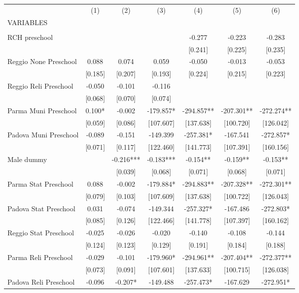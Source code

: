 \begin{tabular}{lcccccc} \hline
 & (1) & (2) & (3) & (4) & (5) & (6) \\
VARIABLES &  &  &  &  &  &  \\ \hline
 &  &  &  &  &  &  \\
RCH preschool &  &  &  & -0.277 & -0.223 & -0.283 \\
 &  &  &  & [0.241] & [0.225] & [0.235] \\
Reggio None Preschool & 0.088 & 0.074 & 0.059 & -0.050 & -0.013 & -0.053 \\
 & [0.185] & [0.207] & [0.193] & [0.224] & [0.215] & [0.223] \\
Reggio Reli Preschool & -0.050 & -0.101 & -0.116 &  &  &  \\
 & [0.068] & [0.070] & [0.074] &  &  &  \\
Parma Muni Preschool & 0.100* & -0.002 & -179.857* & -294.857** & -207.301** & -272.274** \\
 & [0.059] & [0.086] & [107.607] & [137.638] & [100.720] & [126.042] \\
Padova Muni Preschool & -0.089 & -0.151 & -149.399 & -257.381* & -167.541 & -272.857* \\
 & [0.071] & [0.117] & [122.460] & [141.773] & [107.391] & [160.156] \\
Male dummy &  & -0.216*** & -0.183*** & -0.154** & -0.159** & -0.153** \\
 &  & [0.039] & [0.068] & [0.071] & [0.068] & [0.071] \\
Parma Stat Preschool & 0.088 & -0.002 & -179.884* & -294.883** & -207.328** & -272.301** \\
 & [0.079] & [0.103] & [107.609] & [137.638] & [100.722] & [126.043] \\
Padova Stat Preschool & 0.031 & -0.074 & -149.344 & -257.327* & -167.486 & -272.803* \\
 & [0.085] & [0.126] & [122.466] & [141.778] & [107.397] & [160.162] \\
Reggio Stat Preschool & -0.025 & -0.026 & -0.020 & -0.140 & -0.108 & -0.144 \\
 & [0.124] & [0.123] & [0.129] & [0.191] & [0.184] & [0.188] \\
Parma Reli Preschool & -0.029 & -0.101 & -179.960* & -294.961** & -207.404** & -272.377** \\
 & [0.073] & [0.091] & [107.601] & [137.633] & [100.715] & [126.038] \\
Padova Reli Preschool & -0.096 & -0.207* & -149.488 & -257.473* & -167.629 & -272.951* \\

\end{tabular}
